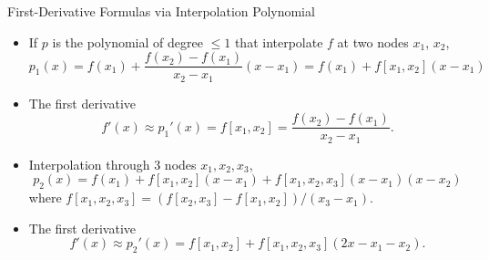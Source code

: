 \documentclass{beamer}
\begin{document}
\begin{frame}{First-Derivative Formulas via Interpolation Polynomial}
\begin{itemize}
\item If $p$ is the polynomial of degree $\le 1$ that interpolate $f$ at two nodes $x_1$, $x_2$, 
\[ 
p_1(x)=f(x_1)+\frac{f(x_2)-f(x_1)}{x_2-x_1}(x-x_1)=f(x_1)+f[x_1,x_2](x-x_1)
\]
\item The first derivative 
\[
f'(x)\approx p_1'(x)=f[x_1,x_2]=\frac{f(x_2)-f(x_1)}{x_2-x_1}.
\]
\item Interpolation through 3 nodes $x_1,x_2, x_3$,
\[
p_2(x)=f(x_1)+f[x_1,x_2] (x-x_1)+f[x_1,x_2,x_3](x-x_1)(x-x_2)
\]
where $f[x_1,x_2,x_3]=(f[x_2,x_3]-f[x_1,x_2])/(x_3-x_1)$. 
\item The first derivative
\[
f'(x)\approx p_2'(x)=f[x_1,x_2]+f[x_1,x_2,x_3](2x-x_1-x_2).
\]
\end{itemize}
\end{frame}
\end{document}
